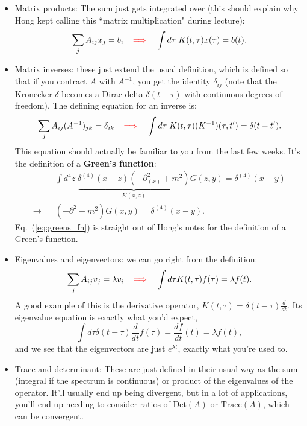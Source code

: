 \documentclass[12pt, oneside]{article}   	%
\theoremstyle{definition}
\begin{document}
\begin{itemize}
	\item Matrix products: The sum just gets integrated over (this should explain why Hong kept calling this ``matrix multiplication" during lecture):
	\begin{equation}
		\sum_j A_{ij} x_j = b_i \;\;\; {\color{red} \implies}\;\;\; \int d\tau\; K(t, \tau) x(\tau) = b(t).
	\end{equation}
	
	\item Matrix inverses: these just extend the usual definition, which is defined so that if you contract $A$ with $A^{-1}$, you get the identity $\delta_{ij}$ (note that the Kronecker $\delta$ becomes a Dirac delta $\delta(t - \tau)$ with continuous degrees of freedom). The defining equation for an inverse is:
	\begin{equation}
		\sum_j A_{ij} (A^{-1})_{jk} = \delta_{ik} \;\;\; {\color{red} \implies}\;\;\; \int d\tau\; K(t, \tau) (K^{-1})(\tau, t') = \delta(t - t').
	\end{equation}
	This equation should actually be familiar to you from the last few weeks. It's the definition of a \textbf{Green's function}:
	\begin{align}
		& \int d^4 z\; \underbrace{\delta^{(4)}(x - z) (-\partial^2_{(x)} + m^2)}_{K(x, z)} G(z, y) = \delta^{(4)}(x - y) \\
		\longrightarrow \;\;\; & (-\partial^2 + m^2) G(x, y) = \delta^{(4)}(x - y).\label{eq:greens_fn}
	\end{align}
	Eq.~(\ref{eq:greens_fn}) is straight out of Hong's notes for the definition of a Green's function. 
	
	\item Eigenvalues and eigenvectors: we can go right from the definition:
	\begin{equation}
		\sum_j A_{ij} v_j = \lambda v_i \;\;\; {\color{red} \implies}\;\;\; \int d\tau K(t, \tau) f(\tau) = \lambda f(t).
	\end{equation}
	A good example of this is the derivative operator, $K(t, \tau) = \delta(t - \tau) \frac{d}{dt}$. Its eigenvalue equation is exactly what you'd expect,
	\begin{equation}
		\int d\tau \delta(t - \tau) \frac{d}{dt} f(\tau) = \frac{df}{dt}(t) = \lambda f(t),
	\end{equation}
	and we see that the eigenvectors are just $e^{\lambda t}$, exactly what you're used to. 
	
	\item Trace and determinant: These are just defined in their usual way as the sum (integral if the spectrum is continuous) or product of the eigenvalues of the operator. It'll usually end up being divergent, but in a lot of applications, you'll end up needing to consider ratios of $\mathrm{Det}(A)$ or $\mathrm{Trace}(A)$, which can be convergent. 
	

\end{itemize}
\end{document}

